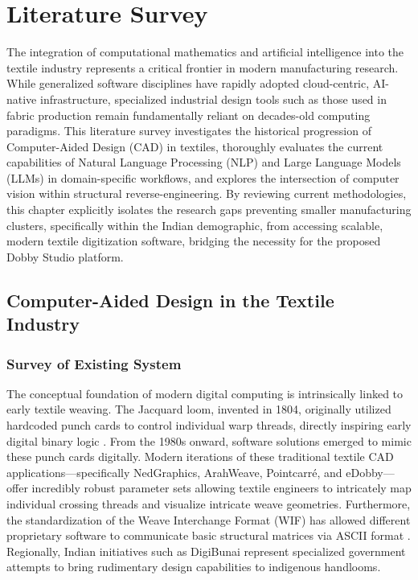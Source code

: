 \chapter{Literature Survey}

The integration of computational mathematics and artificial intelligence into the textile industry represents a critical frontier in modern manufacturing research. While generalized software disciplines have rapidly adopted cloud-centric, AI-native infrastructure, specialized industrial design tools such as those used in fabric production remain fundamentally reliant on decades-old computing paradigms. This literature survey investigates the historical progression of Computer-Aided Design (CAD) in textiles, thoroughly evaluates the current capabilities of Natural Language Processing (NLP) and Large Language Models (LLMs) in domain-specific workflows, and explores the intersection of computer vision within structural reverse-engineering. By reviewing current methodologies, this chapter explicitly isolates the research gaps preventing smaller manufacturing clusters, specifically within the Indian demographic, from accessing scalable, modern textile digitization software, bridging the necessity for the proposed Dobby Studio platform.

\section{Computer-Aided Design in the Textile Industry}

\subsection{Survey of Existing System}
The conceptual foundation of modern digital computing is intrinsically linked to early textile weaving. The Jacquard loom, invented in 1804, originally utilized hardcoded punch cards to control individual warp threads, directly inspiring early digital binary logic \cite{ref1}. From the 1980s onward, software solutions emerged to mimic these punch cards digitally. Modern iterations of these traditional textile CAD applications—specifically NedGraphics, ArahWeave, Pointcarré, and eDobby—offer incredibly robust parameter sets allowing textile engineers to intricately map individual crossing threads and visualize intricate weave geometries. Furthermore, the standardization of the Weave Interchange Format (WIF) has allowed different proprietary software to communicate basic structural matrices via ASCII format \cite{ref2}. Regionally, Indian initiatives such as DigiBunai represent specialized government attempts to bring rudimentary design capabilities to indigenous handlooms.


